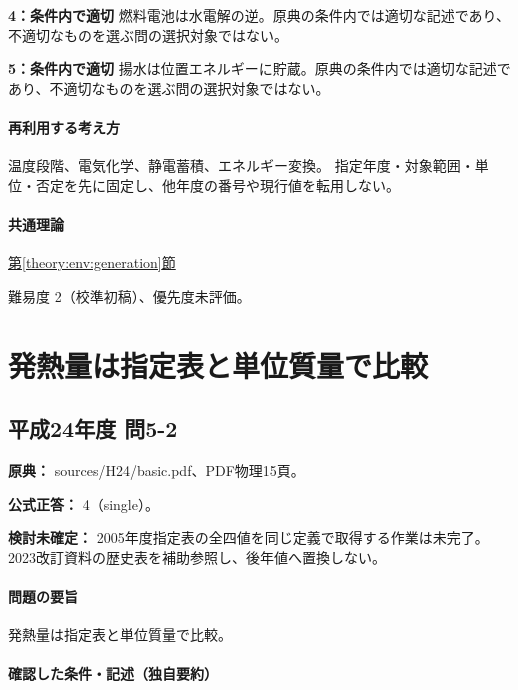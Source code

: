 \noindent\textbf{4：条件内で適切} 燃料電池は水電解の逆。原典の条件内では適切な記述であり、不適切なものを選ぶ問の選択対象ではない。\par

\noindent\textbf{5：条件内で適切} 揚水は位置エネルギーに貯蔵。原典の条件内では適切な記述であり、不適切なものを選ぶ問の選択対象ではない。\par

\paragraph{再利用する考え方} 温度段階、電気化学、静電蓄積、エネルギー変換。 指定年度・対象範囲・単位・否定を先に固定し、他年度の番号や現行値を転用しない。

\paragraph{共通理論} \hyperref[theory:env:generation]{第\ref*{theory:env:generation}節}

\par 難易度 2（校準初稿）、優先度未評価。

\section{発熱量は指定表と単位質量で比較}

\subsection{平成24年度 問5-2}
\label{q:h24-reg-basic-5-2}

\noindent\textbf{原典：} sources/H24/basic.pdf、PDF物理15頁。

\textbf{公式正答：} 4（single）。

\par\textbf{検討未確定：} 2005年度指定表の全四値を同じ定義で取得する作業は未完了。2023改訂資料の歴史表を補助参照し、後年値へ置換しない。

\paragraph{問題の要旨} 発熱量は指定表と単位質量で比較。

\paragraph{確認した条件・記述（独自要約）}\mbox{}\par

